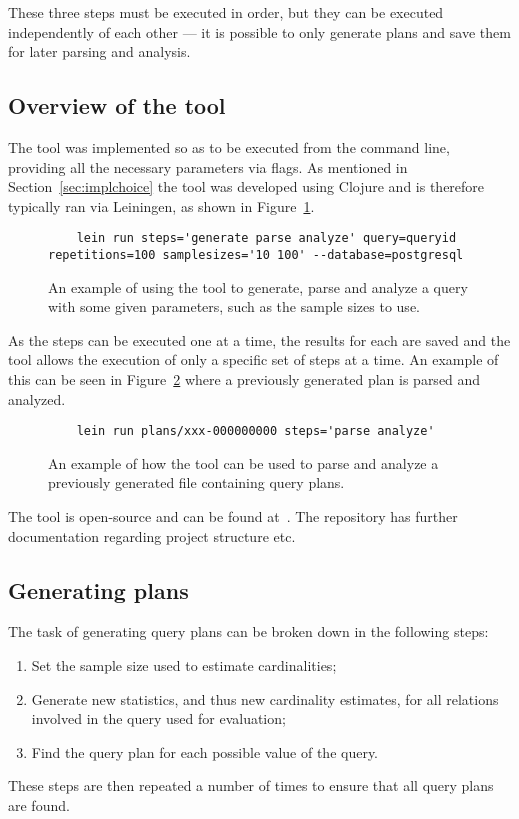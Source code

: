These three steps must be executed in order, but they can be executed
independently of each other --- it is possible to only generate plans and save
them for later parsing and analysis.

\subsection{Overview of the tool}
The tool was implemented so as to be executed from the command line, providing
all the necessary parameters via flags. As mentioned in
Section~\ref{sec:implchoice} the tool was developed using Clojure and is
therefore typically ran via Leiningen, as shown in
Figure~\ref{fig:cmd:runtool1}.

\begin{figure}[ht]
  \begin{verbatim}
    lein run steps='generate parse analyze' query=queryid repetitions=100 samplesizes='10 100' --database=postgresql
  \end{verbatim}
  \caption[Using the tool to generate, parse and analyze a query]{An example of
    using the tool to generate, parse and analyze a query with some given
    parameters, such as the sample sizes to use.}\label{fig:cmd:runtool1}
\end{figure}

As the steps can be executed one at a time, the results for each are saved and
the tool allows the execution of only a specific set of steps at a time. An
example of this can be seen in Figure~\ref{fig:cmd:runtool2} where a previously
generated plan is parsed and analyzed.

\begin{figure}[ht]
  \begin{verbatim}
    lein run plans/xxx-000000000 steps='parse analyze'
  \end{verbatim}
  \caption[Using the tool to parse and analyze a previously generated plan]{An
    example of how the tool can be used to parse and analyze a previously
    generated file containing query plans.}\label{fig:cmd:runtool2}
\end{figure}

The tool is open-source and can be found at~\cite{barksten_mbark_m}. The
repository has further documentation regarding project structure etc.

\subsection{Generating plans}\label{sec:generatingplans}
The task of generating query plans can be broken down in the following steps:
\begin{enumerate}
\item Set the sample size used to estimate cardinalities;
\item Generate new statistics, and thus new cardinality estimates, for all
  relations involved in the query used for evaluation;
\item Find the query plan for each possible value of the query.
\end{enumerate}
These steps are then repeated a number of times to ensure that all query plans
are found.

